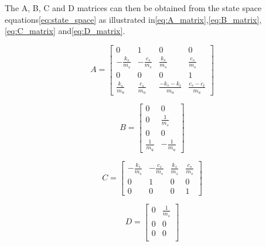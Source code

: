 The A, B, C and D matrices can then be obtained from the state space equations\:\eqref{eq:state_space} as illustrated in\:\eqref{eq:A_matrix},\:\eqref{eq:B_matrix},\:\eqref{eq:C_matrix} and\:\eqref{eq:D_matrix}.

\begin{equation}
\label{eq:A_matrix}
A = 
\begin{bmatrix}
0 & 1 & 0 & 0 \\
-\frac{k_s}{m_s} & -\frac{c_s}{m_s} & \frac{k_s}{m_s} & \frac{c_s}{m_s} \\
0 & 0 & 0 & 1 \\
\frac{k_s}{m_u} & \frac{c_s}{m_u} & \frac{-k_s-k_t}{m_u} & \frac{c_s-c_t}{m_u}
\end{bmatrix}
\end{equation}

\begin{equation}
\label{eq:B_matrix}
B = 
\begin{bmatrix}
0 & 0 \\
0 & \frac{1}{m_s} \\
0 & 0 \\
\frac{1}{m_u} & -\frac{1}{m_u}
\end{bmatrix}
\end{equation}

\begin{equation}
\label{eq:C_matrix}
C = 
\begin{bmatrix}
-\frac{k_s}{m_s} & -\frac{c_s}{m_s} & \frac{k_s}{m_s} & \frac{c_s}{m_s} \\
0 & 1 & 0 & 0 \\
0 & 0 & 0 & 1
\end{bmatrix}
\end{equation}

\begin{equation}
\label{eq:D_matrix}
D = 
\begin{bmatrix}
0 & \frac{1}{m_s} \\
0 & 0 \\
0 & 0 \\
\end{bmatrix}
\end{equation}
